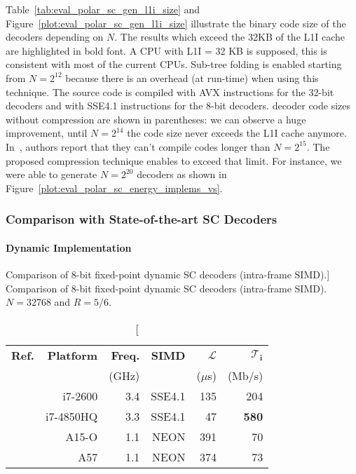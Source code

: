 Table~\ref{tab:eval_polar_sc_gen_l1i_size} and
Figure~\ref{plot:eval_polar_sc_gen_l1i_size} illustrate the binary code size of
the decoders depending on $N$. The results which exceed the 32KB of the L1I
cache are highlighted in bold font. A CPU with L1I = 32 KB is supposed, this is
consistent with most of the current CPUs. Sub-tree folding is enabled starting
from $N=2^{12}$ because there is an overhead (at run-time) when using this
technique. The source code is compiled with AVX instructions for the 32-bit
decoders and with SSE4.1 instructions for the 8-bit decoders. \AFFECT decoder
code sizes without compression are shown in parentheses: we can observe a huge
improvement, until $N=2^{14}$ the code size never exceeds the L1I cache anymore.
In~\cite{Giard2016b}, authors report that they can't compile codes longer than
$N = 2^{15}$. The proposed compression technique enables to exceed that limit.
For instance, we were able to generate $N = 2^{20}$ decoders as shown in
Figure~\ref{plot:eval_polar_sc_energy_implems_vs}.

\subsubsection{Comparison with State-of-the-art SC Decoders}

\paragraph{Dynamic Implementation}

\begin{table}[htp]
  \centering
  \caption
    [Comparison of 8-bit fixed-point dynamic SC decoders (intra-frame SIMD).]
    {Comparison of 8-bit fixed-point dynamic SC decoders (intra-frame SIMD).
     $N = 32768$ and $R = 5/6$.}
  \label{tab:eval_polar_energy_comparison}
  \begin{tabular}{r r r r r r}
    \textbf{Ref.}        & \textbf{Platform} & \textbf{Freq.} & \textbf{SIMD} & $\bm{\mathcal{L}}$ & $\bm{\mathcal{T}_i}$ \\
                         &                   &          (GHz) &               &           ($\mu$s) &               (Mb/s) \\
    \hline
    \hline
    \cite{Giard2014}     &           i7-2600 &            3.4 &        SSE4.1 &                135 &                 204  \\
    \cite{Cassagne2016b} &         i7-4850HQ &            3.3 &        SSE4.1 &                 47 &         \textbf{580} \\
    \cite{Cassagne2016b} &             A15-O &            1.1 &          NEON &                391 &                  70  \\
    \cite{Cassagne2016b} &               A57 &            1.1 &          NEON &                374 &                  73  \\
  \end{tabular}
\end{table}

